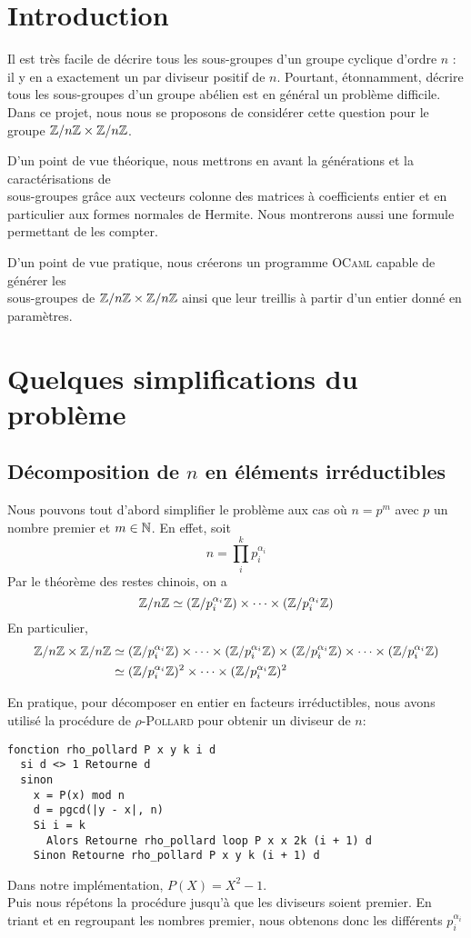 \documentclass[11pt]{article}
\begin{document}

\tableofcontents
\newpage

\section{Introduction}
	Il est très facile de décrire tous les sous-groupes d'un groupe cyclique
	d'ordre $n$ : il y en a exactement un par diviseur positif de $n$.
	Pourtant, étonnamment, décrire tous les sous-groupes d'un groupe abélien
	est en général un problème difficile.\\
	Dans ce projet, nous nous se proposons de considérer cette question pour le groupe $\mathbb Z/n\mathbb Z \times \mathbb Z/n\mathbb Z$.

	D'un point de vue théorique, nous mettrons en avant la générations et la caractérisations de \\
	sous-groupes grâce aux vecteurs colonne des matrices à coefficients entier et en particulier aux formes
	normales de Hermite. Nous montrerons aussi une formule permettant de les compter.

	D'un point de vue pratique, nous créerons un programme \textsc{OCaml} capable de générer les\\
	sous-groupes de $\mathbb Z/n\mathbb Z \times \mathbb Z/n\mathbb Z$ ainsi que leur treillis à partir d'un entier donné en paramètres.
\section{Quelques simplifications du problème}
\subsection{Décomposition de $n$ en éléments irréductibles}
Nous pouvons tout d'abord simplifier le problème aux cas où $n = p^m$ avec $p$ un nombre premier
et $m \in \mathbb N$. En effet, soit
$$n = \prod_i^k p_i^{\alpha_i}$$
Par le théorème des restes chinois, on a
$$ \mathbb Z/n\mathbb Z \simeq (\mathbb Z/p_i^{\alpha_i}\mathbb Z) \times \cdots \times (\mathbb Z/p_i^{\alpha_i}\mathbb Z)$$
En particulier,
\begin{equation*}
	\begin{split}
		\mathbb Z/n\mathbb Z \times \mathbb Z/n\mathbb Z & \simeq
		(\mathbb Z/p_i^{\alpha_i}\mathbb Z) \times \cdots \times (\mathbb Z/p_i^{\alpha_i}\mathbb Z) \times (\mathbb Z/p_i^{\alpha_i}\mathbb Z) \times \cdots \times (\mathbb Z/p_i^{\alpha_i}\mathbb Z)\\
			& \simeq (\mathbb Z/p_i^{\alpha_i}\mathbb Z)^2 \times \cdots \times (\mathbb Z/p_i^{\alpha_i}\mathbb Z)^2
	\end{split}
\end{equation*}

En pratique, pour décomposer en entier en facteurs irréductibles, nous avons utilisé la procédure de
\textsc{$\rho$-Pollard} pour obtenir un diviseur de $n$:
\begin{verbatim}
fonction rho_pollard P x y k i d
  si d <> 1 Retourne d
  sinon
    x = P(x) mod n
    d = pgcd(|y - x|, n)
    Si i = k
      Alors Retourne rho_pollard loop P x x 2k (i + 1) d
    Sinon Retourne rho_pollard P x y k (i + 1) d
\end{verbatim}
Dans notre implémentation, $P(X) = X^2 - 1$.\\
Puis nous répétons la procédure jusqu'à que les diviseurs soient premier.
En triant et en regroupant les nombres premier, nous obtenons donc les différents $p^{\alpha_i}_i$
\end{document}
